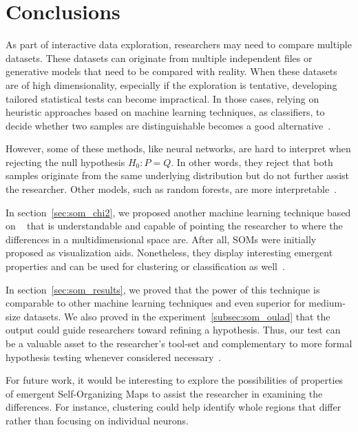 \section{Conclusions}
\label{sec:som_conclusions}
As part of interactive data exploration, researchers may need to
compare multiple datasets.
These datasets can originate from multiple independent files or
generative models that need to be compared with reality. When these
datasets are of high dimensionality, especially if the exploration is
tentative, developing tailored statistical tests can become impractical.
In those cases, relying on heuristic approaches based on machine
learning techniques, as classifiers, to decide whether two samples are
distinguishable becomes a good
alternative~\cite{friedman2004multivariate,kim2021classification}.

However, some of these methods, like neural networks, are hard to interpret
when rejecting the null hypothesis $H_0: P = Q$. In other words, they
reject that both samples originate from the same underlying distribution
but do not further assist the researcher.
Other models, such as random forests, are more  interpretable~\cite{friedman2004multivariate}.

In section~\ref{sec:som_chi2}, we proposed another machine learning
technique based on ~\cite{kohonen1982self} that is
understandable and capable of pointing the researcher to where the differences
in a multidimensional space are. After all, \glspl{SOM} were initially
proposed as visualization aids. Nonetheless, they display interesting
emergent properties and can be used for clustering or classification as
well~\cite{ultsch2007emergence}.

In section~\ref{sec:som_results}, we proved that the power of this
technique is comparable to other machine learning techniques and even
superior for medium-size datasets.
We also proved in the experiment~\ref{subsec:som_oulad} that the
output could guide researchers toward refining a hypothesis. Thus, our
test can be a valuable asset to the researcher's tool-set and complementary
to more formal hypothesis testing whenever considered necessary~\cite{rosenblatt2019better}.

For future work, it would be interesting to explore the possibilities of
properties of emergent Self-Organizing Maps to assist the researcher
in examining the differences.
For instance, clustering could help identify whole regions that differ
rather than focusing on individual neurons.
